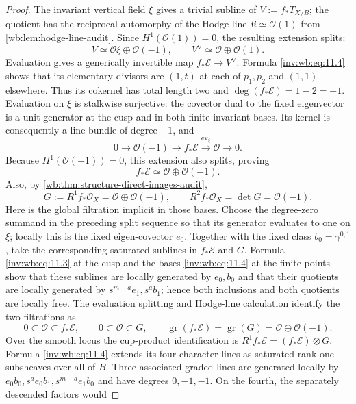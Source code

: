 \begin{proof}
The invariant vertical field $\xi$ gives a trivial subline of
$V:=f_*T_{X/B}$; the quotient has the reciprocal automorphy of the Hodge
line $\mathfrak K\simeq\mathcal O(1)$ from
\cref{wb:lem:hodge-line-audit}.  Since $H^1(\mathcal O(1))=0$, the resulting
extension splits:
\[
 V\simeq\mathcal O\xi\oplus\mathcal O(-1),
 \qquad V^\vee\simeq\mathcal O\oplus\mathcal O(1).
\]
Evaluation gives a generically invertible map
$f_*\mathcal E\to V^\vee$.  Formula \eqref{inv:wb:eq:11.4} shows that its elementary
divisors are $(1,t)$ at each of $p_1,p_2$ and $(1,1)$ elsewhere.  Thus its
cokernel has total length two and
\(\deg(f_*\mathcal E)=1-2=-1\).  Evaluation on $\xi$ is stalkwise
surjective: the covector dual to the fixed eigenvector is a unit generator
at the cusp and in both finite invariant bases.  Its kernel is consequently
a line bundle of degree $-1$, and
\[
 0\longrightarrow\mathcal O(-1)\longrightarrow f_*\mathcal E
 \xrightarrow{\operatorname{ev}_\xi}\mathcal O\longrightarrow0.
\]
Because $H^1(\mathcal O(-1))=0$, this extension also splits, proving
\[
 f_*\mathcal E\simeq\mathcal O\oplus\mathcal O(-1).
\]
Also, by 
\cref{wb:thm:structure-direct-images-audit},
\[
 G:=R^1f_*\mathcal O_X=\mathcal O\oplus\mathcal O(-1),
 \qquad R^2f_*\mathcal O_X=\det G=\mathcal O(-1).
\tag{WBH.11.5}\label{inv:wb:eq:11.5}
\]
Here is the global filtration implicit in those bases.  Choose the
degree-zero summand in the preceding split sequence so that its generator
evaluates to one on $\xi$; locally this is the fixed eigen-covector $e_0$.
Together with the fixed class $b_0=\gamma^{0,1}$, take the corresponding
saturated sublines in $f_*\mathcal E$ and $G$.  Formula \eqref{inv:wb:eq:11.3} at the cusp
and the bases \eqref{inv:wb:eq:11.4} at the finite points show that these sublines are locally
generated by $e_0,b_0$ and that their quotients are locally generated by
$s^{m-a}e_1,s^ab_1$; hence both inclusions and both quotients are locally
free.  The evaluation splitting and Hodge-line calculation identify the two
filtrations as
\[
 0\subset\mathcal O\subset f_*\mathcal E,\qquad
 0\subset\mathcal O\subset G,\qquad
 \operatorname{gr}(f_*\mathcal E)=
 \operatorname{gr}(G)=\mathcal O\oplus\mathcal O(-1).
\]
Over the smooth locus the cup-product identification is
$R^1f_*\mathcal E=(f_*\mathcal E)\otimes G$.  Formula \eqref{inv:wb:eq:11.4} extends its four
character lines as saturated rank-one subsheaves over all of $B$.  Three
associated-graded lines are generated locally by
$e_0b_0,s^ae_0b_1,s^{m-a}e_1b_0$ and have degrees $0,-1,-1$.  On the fourth,
the separately descended factors would

\end{proof}
